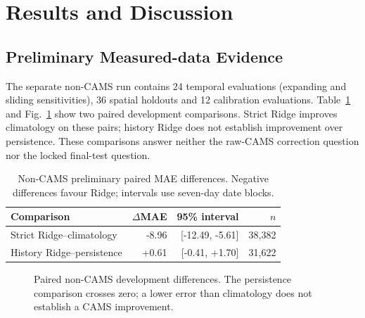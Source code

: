 \section{Results and Discussion}
\subsection{Preliminary Measured-data Evidence}
The separate non-CAMS run contains 24 temporal evaluations (expanding and
sliding sensitivities), 36 spatial holdouts and 12 calibration evaluations.
Table~\ref{tab:paired} and Fig.~\ref{fig:paired} show two paired development
comparisons. Strict Ridge improves climatology on these pairs; history Ridge
does not establish improvement over persistence. These comparisons answer
neither the raw-CAMS correction question nor the locked final-test question.
\begin{table}[t]\centering\footnotesize
\caption{Non-CAMS preliminary paired MAE differences. Negative differences favour Ridge; intervals use seven-day date blocks.}
\label{tab:paired}
\setlength{\tabcolsep}{4pt}
\begin{tabular}{lrrr}
\toprule
Comparison & $\Delta$MAE & 95\% interval & $n$\\\midrule
Strict Ridge--climatology & -8.96 & [-12.49, -5.61] & 38,382\\
History Ridge--persistence & +0.61 & [-0.41, +1.70] & 31,622\\
\bottomrule\end{tabular}
\end{table}
\begin{figure}[t]\centering\AirGuardPaired
\caption{Paired non-CAMS development differences. The persistence comparison
crosses zero; a lower error than climatology does not establish a CAMS improvement.}
\label{fig:paired}\end{figure}

